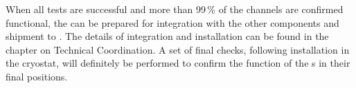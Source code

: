 
When all tests are successful and more than \num{99}\,\% of the channels are confirmed functional, the  can be prepared for integration with the other components and shipment to \surf{}.  The details of integration and installation can be found in the chapter on Technical Coordination.  A set of final checks, following installation in the cryostat, will definitely be performed to confirm the function of the s in their final positions.

